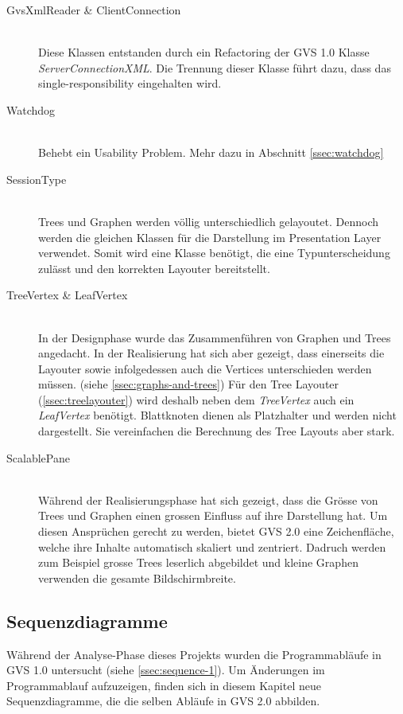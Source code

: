 \documentclass[11pt,a4paper,english,oneside]{book}
\numberwithin{equation}{chapter}
\begin{document}
	\begin{description} \label{desc:architecture-changes}
		\item[GvsXmlReader \& ClientConnection ] \hfill \\ Diese Klassen entstanden durch ein Refactoring der GVS 1.0 Klasse \textit{ServerConnectionXML}. Die Trennung dieser Klasse führt dazu, dass das \gls{single-responsibility}  eingehalten wird. 
		\item[Watchdog] \hfill \\ Behebt ein Usability Problem. Mehr dazu in Abschnitt \ref{ssec:watchdog}
		\item[SessionType] \hfill \\ Trees und Graphen werden völlig unterschiedlich gelayoutet. Dennoch werden die gleichen Klassen für die Darstellung im Presentation Layer verwendet. Somit wird eine Klasse benötigt, die eine Typunterscheidung zulässt und den korrekten Layouter bereitstellt.
		\item[TreeVertex \& LeafVertex] \hfill \\ 
		In der Designphase wurde das Zusammenführen von Graphen und Trees angedacht. In der Realisierung hat sich aber gezeigt, dass einerseits die Layouter sowie infolgedessen auch die Vertices unterschieden werden müssen. (siehe \ref{ssec:graphs-and-trees}) Für den Tree Layouter (\ref{ssec:treelayouter}) wird deshalb neben dem \textit{TreeVertex} auch ein \textit{LeafVertex} benötigt.  Blattknoten dienen als Platzhalter und werden nicht dargestellt. Sie vereinfachen die Berechnung des Tree Layouts aber stark.
		\item[ScalablePane] \hfill \\  Während der Realisierungsphase hat sich gezeigt, dass die Grösse von Trees und Graphen einen grossen Einfluss auf ihre Darstellung hat. Um diesen Ansprüchen gerecht zu werden, bietet GVS 2.0 eine Zeichenfläche, welche ihre Inhalte automatisch skaliert und zentriert. Dadruch werden zum Beispiel grosse Trees leserlich abgebildet und kleine Graphen verwenden die gesamte Bildschirmbreite. 
	\end{description}
	
	 \label{pdf:classdiagramm}
	
	\subsection{Sequenzdiagramme}
	Während der Analyse-Phase dieses Projekts wurden die Programmabläufe in GVS 1.0 untersucht (siehe \ref{ssec:sequence-1}). Um Änderungen im Programmablauf aufzuzeigen, finden sich in diesem Kapitel neue Sequenzdiagramme, die die selben Abläufe in GVS 2.0 abbilden. 
	
\end{document}

